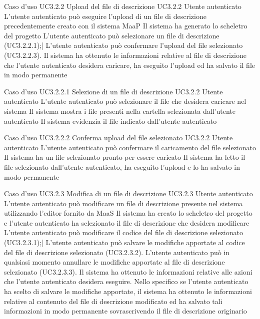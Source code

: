 \UCtitle
{Caso d'uso UC3.2.2}
{Upload del file di descrizione}
\UC
{UC3.2.2}
{Utente autenticato}
{L'utente autenticato può eseguire l'upload di un file di descrizione precedentemente creato con il sistema MaaP}
{Il sistema ha generato lo scheletro del progetto}
\scenario
{
L'utente autenticato può selezionare un file di descrizione (UC3.2.2.1);|
L'utente autenticato può confermare l'upload del file selezionato (UC3.2.2.3).
}
\post
{Il sistema ha ottenuto le informazioni relative al file di descrizione che l'utente autenticato desidera caricare, ha eseguito l'upload ed ha salvato il file in modo permanente}

\UCtitle
{Caso d'uso UC3.2.2.1}
{Selezione di un file di descrizione}
\UC
{UC3.2.2}
{Utente autenticato}
{L'utente autenticato può selezionare il file che desidera caricare nel sistema}
{Il sistema mostra i file presenti nella cartella selezionata dall'utente autenticato}
\post
{Il sistema evidenzia il file indicato dall'utente autenticato}

\UCtitle
{Caso d'uso UC3.2.2.2}
{Conferma upload del file selezionato}
\UC
{UC3.2.2}
{Utente autenticato}
{L'utente autenticato può confermare il caricamento del file selezionato}
{Il sistema ha un file selezionato pronto per essere caricato}
\post
{Il sistema ha letto il file selezionato dall'utente autenticato, ha eseguito l'upload e lo ha salvato in modo permanente}

\UCtitle
{Caso d'uso UC3.2.3}
{Modifica di un file di descrizione}
\UC
{UC3.2.3}
{Utente autenticato}
{L'utente autenticato può modificare un file di descrizione presente nel sistema utilizzando l'editor fornito da MaaS}
{Il sistema ha creato lo scheletro del progetto e l'utente autenticato ha selezionato il file di descrizione che desidera modificare}
\scenario
{L'utente autenticato può modificare il codice del file di descrizione selezionato (UC3.2.3.1);|
L'utente autenticato può salvare le modifiche apportate al codice del file di descrizione selezionato (UC3.2.3.2).
}
\estensioni
{L'utente autenticato può in qualsiasi momento annullare le modifiche apportate al file di descrizione selezionato (UC3.2.3.3).}
\post
{Il sistema ha ottenuto le informazioni relative alle azioni che l'utente autenticato desidera eseguire. Nello specifico se l'utente autenticato ha scelto di salvare le modifiche apportate, il sistema ha ottenuto le informazioni relative al contenuto del file di descrizione modificato ed ha salvato tali informazioni in modo permanente sovrascrivendo il file di descrizione originario}

